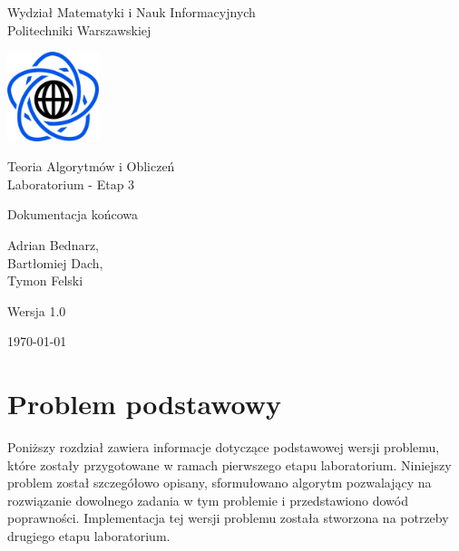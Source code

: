 \documentclass[12pt,a4paper]{article}
\theoremstyle{definition}
\begin{document}
\begin{titlepage}
	\centering
	{\Large Wydział Matematyki i Nauk Informacyjnych\\Politechniki Warszawskiej \par}
	\vspace{1cm}
	\includegraphics[width=0.2\textwidth]{res/img/logo.png} \par
	\vspace{4cm}
	{\LARGE Teoria Algorytmów i Obliczeń\\Laboratorium - Etap 3 \par}
	\vspace{0.5cm}
	{\LARGE Dokumentacja końcowa \par}
	\vspace{2cm}
	{\large Adrian Bednarz,\\Bartłomiej Dach,\\Tymon Felski \par}
	\vspace{2cm}
	{\large Wersja 1.0 \par}
	\vspace{0.5cm}
	{\large \today \par}
\end{titlepage}

\newpage
\tableofcontents
\newpage

\section{Problem podstawowy}
Poniższy rozdział zawiera informacje dotyczące podstawowej wersji problemu, które zostały przygotowane w ramach pierwszego etapu laboratorium. Niniejszy problem został szczegółowo opisany, sformułowano algorytm pozwalający na rozwiązanie dowolnego zadania w tym problemie i przedstawiono dowód poprawności. Implementacja tej wersji problemu została stworzona na potrzeby drugiego etapu laboratorium.
\end{document}
